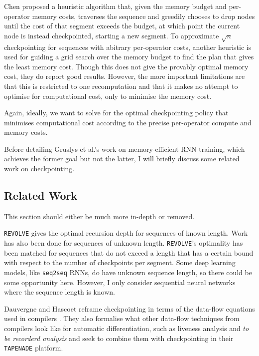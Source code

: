 Chen proposed a heuristic algorithm that, given the memory budget and per-operator memory costs, traverses the sequence and greedily chooses to drop nodes until the cost of that segment exceeds the budget, at which point the current node is instead checkpointed, starting a new segment.
To approximate \(\sqrt{n}\) checkpointing for sequences with abitrary per-operator costs, another heuristic is used for guiding a grid search over the memory budget to find the plan that gives the least memory cost.
Though this does not give the provably optimal memory cost, they do report good results.
However, the more important limitations are that this is restricted to one recomputation and that it makes no attempt to optimise for computational cost, only to minimise the memory cost.

Again, ideally, we want to solve for the optimal checkpointing policy that minimises computational cost according to the precise per-operator compute and memory costs. 

Before detailing Gruslys et al.'s \cite{Gruslys2016} work on memory-efficient RNN training, which achieves the former goal but not the latter, I will briefly discuss some related work on checkpointing.

\subsection{Related Work}
 This section should either be much more in-depth or removed.

\texttt{REVOLVE} gives the optimal recursion depth for sequences of known length.
Work has also been done for sequences of unknown length.
\texttt{REVOLVE}'s optimality has been matched for sequences that do not exceed a length that has a certain bound with respect to the number of checkpoints per segment.
Some deep learning models, like \texttt{seq2seq} RNNs, do have unknown sequence length, so there could be some opportunity here.
However, I only consider sequential neural networks where the sequence length is known.

Dauvergne and Hascoet reframe checkpointing in terms of the data-flow equations used in compilers \cite{Dauvergne2006}.
They also formalise what other data-flow techniques from compilers look like for automatic differentiation, such as liveness analysis and \textit{to be recorderd analysis} and seek to combine them with checkpointing in their \texttt{TAPENADE} platform.

